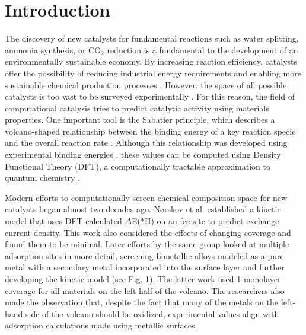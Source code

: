 \documentclass[preprint,12pt]{elsarticle}
\begin{document}
\raggedright
\section{Introduction}

The discovery of new catalysts for fundamental reactions such as water splitting, ammonia synthesis, or CO$_2$ reduction is a fundamental to the development of an environmentally sustainable economy. By increasing reaction efficiency, catalysts offer the possibility of reducing industrial energy requirements and enabling more sustainable chemical production processes \cite{osti_1545774}. However, the space of all possible catalysts is too vast to be surveyed experimentally \cite{tran2018active}. For this reason, the field of computational catalysis tries to predict catalytic activity using materials properties. One important tool is the Sabatier principle, which describes a volcano-shaped relationship between the binding energy of a key reaction specie and the overall reaction rate \cite{medford2015Sabatier}. Although this relationship was developed using experimental binding energies \cite{trasatti1972work}, these values can be computed using Density Functional Theory (DFT), a computationally tractable approximation to quantum chemistry \cite{osti_1545774,ooka2021sabatier}.

Modern efforts to computationally screen chemical composition space for new catalysts began almost two decades ago. N{\o}rskov et al. \cite{norskov2005trends} established a kinetic model that uses DFT-calculated $\Delta$E(*H) on an fcc site to predict exchange current density. This work also considered the effects of changing coverage and found them to be minimal. Later efforts by the same group looked at multiple adsorption sites in more detail, screening bimetallic alloys modeled as a pure metal with a secondary metal incorporated into the surface layer \cite{greeley2006computational} and further developing the kinetic model \cite{skulason2010modeling} (see Fig. 1). The latter work used 1 monolayer coverage for all materials on the left half of the volcano. The researchers also made the observation that, despite the fact that many of the metals on the left-hand side of the volcano should be oxidized, experimental values align with adsorption calculations made using metallic surfaces. 
\end{document}
